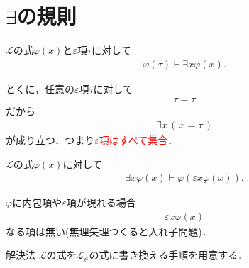 \section{$\exists$の規則}
	\begin{screen}
		\begin{logicalaxm}
			$\mathcal{L}$の式$\varphi(x)$と$\varepsilon$項$\tau$に対して
			\begin{align}
				\varphi(\tau) \vdash \exists x \varphi(x).
			\end{align}
		\end{logicalaxm}
	\end{screen}
	
	とくに，任意の$\varepsilon$項$\tau$に対して
	\begin{align}
		\tau = \tau
	\end{align}
	だから
	\begin{align}
		\exists x\, (\, x = \tau\, )
	\end{align}
	が成り立つ．つまり\textcolor{red}{$\varepsilon$項はすべて集合}．
	
\newpage
	\begin{screen}
		\begin{logicalaxm}
			$\mathcal{L}$の式$\varphi(x)$に対して
			\begin{align}
				\exists x \varphi(x) \vdash \varphi(\varepsilon x \varphi(x)).
			\end{align}
		\end{logicalaxm}
	\end{screen}
	
	$\varphi$に内包項や$\varepsilon$項が現れる場合
	\begin{align}
		\varepsilon x \varphi(x)
	\end{align}
	なる項は無い(無理矢理つくると入れ子問題)．
	
	
	\begin{itembox}[l]{解決法}
		$\mathcal{L}$の式を$\mathcal{L}_{\in}$の式に書き換える手順を用意する．
	\end{itembox}
